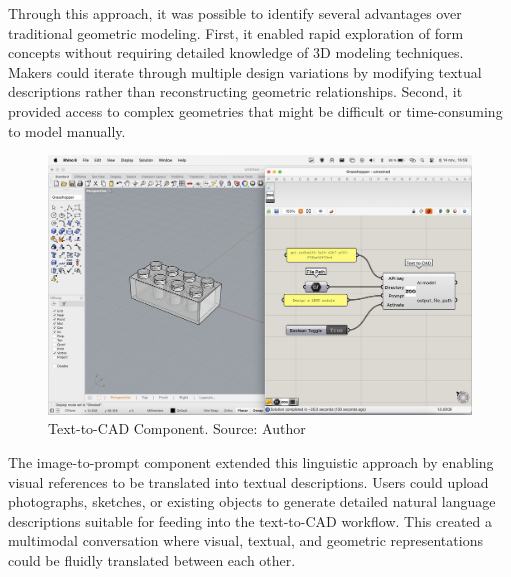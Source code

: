 Through this approach, it was possible to identify several advantages over traditional geometric modeling. First, it enabled rapid exploration of form concepts without requiring detailed knowledge of 3D modeling techniques. Makers could iterate through multiple design variations by modifying textual descriptions rather than reconstructing geometric relationships. Second, it provided access to complex geometries that might be difficult or time-consuming to model manually.

\begin{figure}[H]
\centering
\includegraphics[width=1\textwidth]{figures/chapter3/text-to-cad.png}
\caption{Text-to-CAD Component. Source: Author}
\label{fig:text-to-cad}
\end{figure}

The image-to-prompt component extended this linguistic approach by enabling visual references to be translated into textual descriptions. Users could upload photographs, sketches, or existing objects to generate detailed natural language descriptions suitable for feeding into the text-to-CAD workflow. This created a multimodal conversation where visual, textual, and geometric representations could be fluidly translated between each other.


